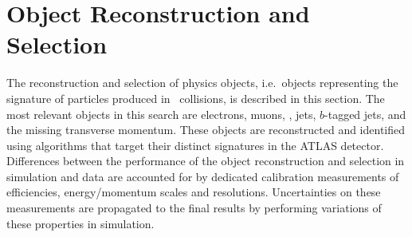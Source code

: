 \section{Object Reconstruction and Selection}
\label{sec:object_reconstruction}

The reconstruction and selection of physics objects, i.e.\ objects representing
the signature of particles produced in \pp~collisions, is described in this
section. The most relevant objects in this search are electrons, muons,
\tauhadvis, jets, $b$-tagged jets, and the missing transverse momentum. These
objects are reconstructed and identified using algorithms that target their
distinct signatures in the ATLAS detector.
Differences between the performance of the object reconstruction and selection
in simulation and data are accounted for by dedicated calibration measurements
of efficiencies, energy/momentum scales and resolutions. Uncertainties on these
measurements are propagated to the final results by performing variations of
these properties in simulation.

